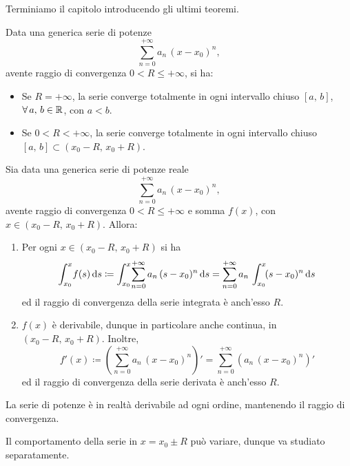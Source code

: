 \documentclass[../../analisi2]{subfiles}
\begin{document}
        Terminiamo il capitolo introducendo gli ultimi teoremi.

        \begin{teorema}
            Data una generica serie di potenze
            \[
                \sum_{n = 0}^{+\infty} a_n \, (x - x_0)^n,
            \]
            avente raggio di convergenza \(0 < R \leqslant +\infty\), si ha:
            \begin{itemize}
                \item Se \(R = +\infty\), la serie converge totalmente in ogni intervallo chiuso \([a, \, b]\),
                    \(\forall \, a, \, b \in \mathbb{R}\), con \(a < b\).
                \item Se \(0 < R < +\infty\), la serie converge totalmente in ogni intervallo chiuso \([a, \, b] \subset (x_0 - R, \, x_0 + R)\).
            \end{itemize}
        \end{teorema}

        \begin{teorema}
            Sia data una generica serie di potenze reale
            \[
                \sum_{n = 0}^{+\infty} a_n \, (x - x_0)^n,
            \]
            avente raggio di convergenza \(0 < R \leqslant +\infty\) e somma \(f(x)\), con \(x \in (x_0 - R, \, x_0 + R)\). Allora:
            \begin{enumerate}
                \item Per ogni \(x \in (x_0 - R, \, x_0 + R)\) si ha
                    \[
                        \int_{x_0}^{x} \! f(s) \, \mathrm{d}s \coloneqq \int_{x_0}^{x} \! \sum_{n = 0}^{+\infty} a_n \, (s - x_0)^n \, \mathrm{d}s = \sum_{n = 0}^{+\infty} a_n \, \int_{x_0}^{x} \! (s - x_0)^n \, \mathrm{d}s
                    \]
                    ed il raggio di convergenza della serie integrata è anch'esso \(R\).
                \item \(f(x)\) è derivabile, dunque in particolare anche continua, in \((x_0 - R, \, x_0 + R)\). Inoltre,
                    \[
                        f'(x) \coloneqq \left(\sum_{n = 0}^{+\infty} a_n \, (x - x_0)^n\right)' = \sum_{n = 0}^{+\infty} \left(a_n \, (x - x_0)^n\right)'
                    \]
                    ed il raggio di convergenza della serie derivata è anch'esso \(R\).
            \end{enumerate}
        \end{teorema}
        \begin{osservazione}
            La serie di potenze è in realtà derivabile ad ogni ordine, mantenendo il raggio di convergenza.
        \end{osservazione}
        \begin{osservazione}
            Il comportamento della serie in \(x = x_0 \pm R\) può variare, dunque va studiato separatamente.
        \end{osservazione}
\end{document}
